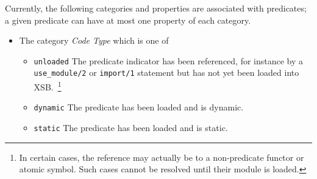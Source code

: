 \begin{description}
    Currently, the following categories and properties are associated
    with predicates; a given predicate can have at most one property
    of each category.

\begin{itemize}
\item The category {\em Code Type} which is one of
\begin{itemize}
%
\item{\tt unloaded} The predicate indicator has been referenced, for
  instance by a {\tt use\_module/2} or {\tt import/1} statement but
  has not yet been loaded into XSB.~\footnote{In certain cases, the
    reference may actually be to a non-predicate functor or atomic
    symbol.  Such cases cannot be resolved until their module is
    loaded.}
%
\item{\tt dynamic} The predicate has been loaded and is dynamic.
%
\item{\tt static} The predicate has been loaded and is static.


\end{itemize}
\end{itemize}
\end{description}
